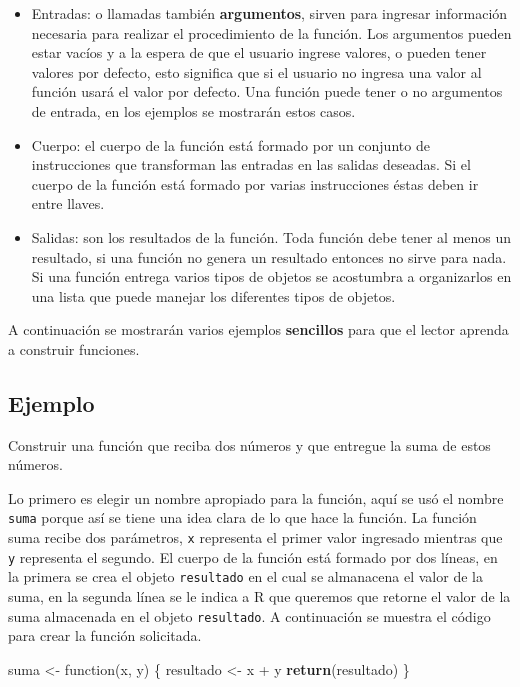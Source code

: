 \documentclass[10pt,]{krantz}
\makeatletter
\newenvironment{Shaded}{\begin{snugshade}}{\end{snugshade}}
\newcommand{\KeywordTok}[1]{\textcolor[rgb]{0.13,0.29,0.53}{\textbf{{#1}}}}
\newcommand{\StringTok}[1]{\textcolor[rgb]{0.31,0.60,0.02}{{#1}}}
\newcommand{\NormalTok}[1]{{#1}}
\providecommand{\tightlist}{%
  \setlength{\itemsep}{0pt}\setlength{\parskip}{0pt}}
\let\proglang=\textsf
\newenvironment{kframe}{%
\medskip{}
\setlength{\fboxsep}{.8em}
 \def\at@end@of@kframe{}%
 \ifinner\ifhmode%
  \def\at@end@of@kframe{\end{minipage}}%
  \begin{minipage}{\columnwidth}%
 \fi\fi%
 \def\FrameCommand##1{\hskip\@totalleftmargin \hskip-\fboxsep
 \colorbox{shadecolor}{##1}\hskip-\fboxsep
     \hskip-\linewidth \hskip-\@totalleftmargin \hskip\columnwidth}%
 \MakeFramed {\advance\hsize-\width
   \@totalleftmargin\z@ \linewidth\hsize
   \@setminipage}}%
 {\par\unskip\endMakeFramed%
 \at@end@of@kframe}
\renewenvironment{Shaded}{\begin{kframe}}{\end{kframe}}
\makeatother
\begin{document}
\begin{itemize}
\tightlist
\item
  Entradas: o llamadas también \textbf{argumentos}, sirven para ingresar
  información necesaria para realizar el procedimiento de la función.
  Los argumentos pueden estar vacíos y a la espera de que el usuario
  ingrese valores, o pueden tener valores por defecto, esto significa
  que si el usuario no ingresa una valor al función usará el valor por
  defecto. Una función puede tener o no argumentos de entrada, en los
  ejemplos se mostrarán estos casos.
\item
  Cuerpo: el cuerpo de la función está formado por un conjunto de
  instrucciones que transforman las entradas en las salidas deseadas. Si
  el cuerpo de la función está formado por varias instrucciones éstas
  deben ir entre llaves.
\item
  Salidas: son los resultados de la función. Toda función debe tener al
  menos un resultado, si una función no genera un resultado entonces no
  sirve para nada. Si una función entrega varios tipos de objetos se
  acostumbra a organizarlos en una lista que puede manejar los
  diferentes tipos de objetos.
\end{itemize}

A continuación se mostrarán varios ejemplos \textbf{sencillos} para que
el lector aprenda a construir funciones.

\subsection*{Ejemplo}\label{ejemplo-8}


Construir una función que reciba dos números y que entregue la suma de
estos números.

Lo primero es elegir un nombre apropiado para la función, aquí se usó el
nombre \texttt{suma} porque así se tiene una idea clara de lo que hace
la función. La función suma recibe dos parámetros, \texttt{x} representa
el primer valor ingresado mientras que \texttt{y} representa el segundo.
El cuerpo de la función está formado por dos líneas, en la primera se
crea el objeto \texttt{resultado} en el cual se almanacena el valor de
la suma, en la segunda línea se le indica a \proglang{R} que queremos
que retorne el valor de la suma almacenada en el objeto
\texttt{resultado}. A continuación se muestra el código para crear la
función solicitada.

\begin{Shaded}
\begin{Highlighting}[]
\NormalTok{suma <-}\StringTok{ }\NormalTok{function(x, y) \{}
  \NormalTok{resultado <-}\StringTok{ }\NormalTok{x +}\StringTok{ }\NormalTok{y}
  \KeywordTok{return}\NormalTok{(resultado)}
\NormalTok{\}}
\end{Highlighting}
\end{Shaded}
\end{document}
